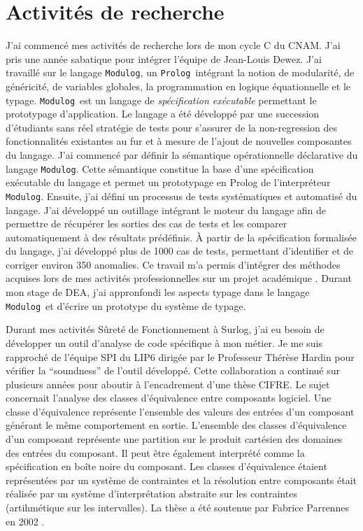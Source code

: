 \documentclass[a4paper,12pt]{article}
\newcommand{\Modulog}{{\tt Modulog}}
\newcommand{\Prolog}{{\tt Prolog}}
\newcommand{\smallspace}{\vspace{0.25cm}}
\begin{document}
\newpage
\section{Activit\'es de recherche}
J'ai commenc\'e mes activit\'es de recherche lors de mon cycle C du
CNAM. J'ai pris une ann\'ee sabatique pour int\'egrer l'\'equipe de
Jean-Louis Dewez. J'ai travaill\'e sur le langage \Modulog, un
\Prolog\ int\'egrant la notion de modularit\'e, de g\'en\'ericit\'e,
de variables globales, la programmation en logique \'equationnelle et
le typage. \Modulog\ est un langage de \emph{sp\'ecification
  ex\'ecutable} permettant le prototypage d'application.
Le langage a \'et\'e d\'evelopp\'e
par une succession d'\'etudiants sans r\'eel strat\'egie de tests pour
s'assurer de la non-regression des fonctionnalit\'es existantes au fur
et \`a mesure de l'ajout de nouvelles composantes du langage. J'ai
commenc\'e par d\'efinir la s\'emantique op\'erationnelle
d\'eclarative du langage \Modulog. Cette s\'emantique constitue la
base d'une sp\'ecification ex\'ecutable du langage et permet un
prototypage en Prolog de l'interpr\'eteur \Modulog.  Ensuite, j'ai
d\'efini un processus de tests syst\'ematiques et automatis\'e du
langage. J'ai d\'evelopp\'e un outillage int\'egrant le moteur du
langage afin de permettre de r\'ecup\'erer les sorties des cas de
tests et les comparer automatiquement \`a des r\'esultats
pr\'ed\'efinis. \`A partir de la sp\'ecification formalis\'ee du
langage, j'ai d\'evelopp\'e plus de 1000 cas de tests, permettant
d'identifier et de corriger environ 350 anomalies. Ce travail m'a
permis d'int\'egrer des m\'ethodes acquises lors de mes activit\'es
professionnelles sur un projet acad\'emique \cite{Ing-PAyrault}.
Durant mon stage de DEA, j'ai appronfondi les aspects typage dans le
langage \Modulog\ et d'\'ecrire un prototype du syst\`eme de typage. 

\smallspace
Durant mes activit\'es S\^uret\'e de Fonctionnement \`a Surlog, j'ai
eu besoin de d\'evelopper un outil d'analyse de code sp\'ecifique \`a
mon m\'etier. Je me suis rapproch\'e de l'\'equipe SPI du LIP6
dirig\'ee par le Professeur Th\'er\`ese Hardin pour v\'erifier la
``soundness'' de l'outil d\'evelopp\'e.  Cette collaboration a
continu\'e sur plusieurs ann\'ees pour aboutir \`a l'encadrement d'une
th\`ese CIFRE. Le sujet concernait l'analyse des classes
d'\'equivalence entre composants logiciel. Une classe d'\'equivalence
repr\'esente l'ensemble des valeurs des entr\'ees d'un composant
g\'en\'erant le m\^eme comportement en sortie. L'ensemble des classes
d'\'equivalence d'un composant repr\'esente une partition sur le
produit cart\'esien des domaines des entr\'ees du composant. Il peut
\^etre \'egalement interpr\'et\'e comme la sp\'ecification en bo\^ite
noire du composant. Les classes d'\'equivalence \'etaient
repr\'esent\'ees par un syst\`eme de contraintes et la r\'esolution
entre composants \'etait r\'ealis\'ee par un syst\`eme
d'interpr\'etation abstraite sur les contraintes (artihm\'etique sur
les intervalles).  La th\`ese a \'et\'e soutenue par Fabrice Parrennes
en 2002 \cite{Phd-FParrennes}.
\end{document}
